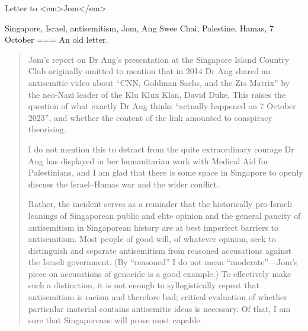 Letter to <em>Jom</em>

Singapore, Israel, antisemitism, Jom, Ang Swee Chai, Palestine, Hamas, 7 October
===
An old letter.
\begin{quote}
Jom’s report on Dr Ang’s presentation at the Singapore Island Country Club originally omitted to mention that in 2014 Dr Ang shared an antisemitic video about “CNN, Goldman Sachs, and the Zio Matrix” by the neo-Nazi leader of the Klu Klux Klan, David Duke. This raises the question of what exactly Dr Ang thinks “actually happened on 7 October 2023”, and whether the content of the link amounted to conspiracy theorising.

I do not mention this to detract from the quite extraordinary courage Dr Ang has displayed in her humanitarian work with Medical Aid for Palestinians, and I am glad that there is some space in Singapore to openly discuss the Israel–Hamas war and the wider conflict.

Rather, the incident serves as a reminder that the historically pro-Israeli leanings of Singaporean public and elite opinion and the general paucity of antisemitism in Singaporean history are at best imperfect barriers to antisemitism. Most people of good will, of whatever opinion, seek to distinguish and separate antisemitism from reasoned accusations against the Israeli government. (By “reasoned” I do not mean “moderate”—Jom’s piece on accusations of genocide is a good example.) To effectively make such a distinction, it is not enough to syllogistically repeat that antisemitism is racism and therefore bad; critical evaluation of whether particular material contains antisemitic ideas is necessary. Of that, I am sure that Singaporeans will prove most capable.
\end{quote}

\nocite{loo2024a}